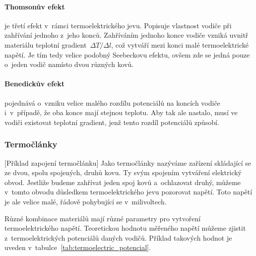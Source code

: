 \paragraph{Thomsonův efekt} je třetí efekt v~rámci termoelektrického jevu.
Popisuje vlastnost vodiče při zahřívání jednoho z~jeho konců. Zahříváním
jednoho konce vodiče vzniká uvnitř materiálu teplotní gradient~$\Delta T/\Delta l$, 
což vytváří mezi konci malé termoelektrické napětí. Je tím tedy velice
podobný Seebeckovu efektu, ovšem zde se jedná pouze o~jeden vodič namísto dvou
různých kovů.~\cite{jreichl-thomson}

\paragraph{Benedickův efekt} pojednává o~vzniku velice malého rozdílu
potenciálů na koncích vodiče i~v~případě, že oba konce mají stejnou teplotu.
Aby tak ale nastalo, musí ve vodiči existovat teplotní gradient, jenž tento
rozdíl potenciálů způsobí.~\cite{diplomka} 

\subsubsection{Termočlánky}
[Příklad zapojení termočlánku]
Jako termočlánky nazýváme zařízení skládající se ze dvou, spolu spojených,
druhů kovu. Ty svým spojením vytváření elektrický obvod. Jestliže budeme
zahřívat jeden spoj kovů a~ochlazovat druhý, můžeme v~tomto obvodu důsledkem
termoelektrického jevu pozorovat napětí. Toto napětí je ale velice malé, řádově
pohybující se v~milivoltech.


Různé kombinace materiálů mají různé parametry pro vytvoření termoelektrického 
napětí. Teoretickou hodnotu měřeného napětí můžeme zjistit z~termoelektrických
potenciálů daných vodičů. Příklad takových hodnot je uveden 
v~tabulce~\ref{tab:termoelectric_potencial}.

\newcommand{\phm}{\phantom{-}}

